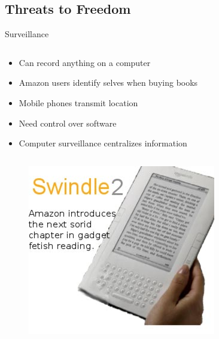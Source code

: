 \subsection{Threats to Freedom}
\begin{frame}{Surveillance}
  \begin{column}{0.45\textwidth}
    \begin{itemize}
      \item Can record anything on a computer
      \item Amazon users identify selves when buying books
      \item Mobile phones transmit location
      \item Need control over software
      \item Computer surveillance centralizes information
    \end{itemize}
  \end{column}
  \begin{column}{0.5\textwidth}\raggedleft{}
    \begin{figure}
      \includegraphics[width=\textwidth]{images/swindle.jpg}
    \end{figure}
  \end{column}
\end{frame}


